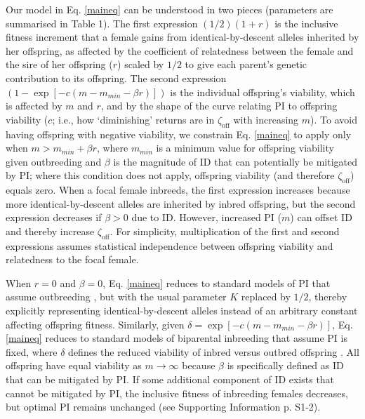 \documentclass[12pt]{article}
\begin{document}
Our model in Eq. \ref{maineq} can be understood in two pieces (parameters are summarised in Table 1). The first expression $\left(1/2\right) \left(1 + r\right)$ is the inclusive fitness increment that a female gains from identical-by-descent alleles inherited by her offspring, as affected by the coefficient of relatedness between the female and the sire of her offspring ($r$) scaled by $1/2$ to give each parent's genetic contribution to its offspring. The second expression $\left(1 - \exp\left[-c\left(m-m_{min}-\beta r\right)\right]\right)$ is the individual offspring's viability, which is affected by $m$ and $r$, and by the shape of the curve relating PI to offspring viability ($c$; i.e., how `diminishing' returns are in $\zeta_{\textrm{off}}$ with increasing $m$). To avoid having offspring with negative viability, we constrain Eq. \ref{maineq} to apply only when $m > m_{min} + \beta r$, where $m_{min}$ is a minimum value for offspring viability given outbreeding and $\beta$ is the magnitude of ID that can potentially be mitigated by PI; where this condition does not apply, offspring viability (and therefore $\zeta_{\textrm{off}}$) equals zero. When a focal female inbreeds, the first expression increases because more identical-by-descent alleles are inherited by inbred offspring, but the second expression decreases if $\beta>0$ due to ID. However, increased PI ($m$) can offset ID and thereby increase $\zeta_{\textrm{off}}$. For simplicity, multiplication of the first and second expressions assumes statistical independence between offspring viability and relatedness to the focal female.

When $r=0$ and $\beta=0$, Eq. \ref{maineq} reduces to standard models of PI that assume outbreeding \cite[e.g.,][]{Macnair1978, Parker1978}, but with the usual parameter $K$ replaced by $1/2$, thereby explicitly representing identical-by-descent alleles instead of an arbitrary constant affecting offspring fitness. Similarly, given $\delta = \exp\left[-c\left(m-m_{min}-\beta r\right)\right]$, Eq. \ref{maineq} reduces to standard models of biparental inbreeding that assume PI is fixed, where $\delta$ defines the reduced viability of inbred versus outbred offspring \cite[see][]{Kokko2006, Parker2006, Duthie2015a}.  All offspring have equal viability as $m \to \infty$ because $\beta$ is specifically defined as ID that can be mitigated by PI. If some additional component of ID exists that cannot be mitigated by PI, the inclusive fitness of inbreeding females decreases, but optimal PI remains unchanged (see Supporting Information p. S1-2).
\end{document}
